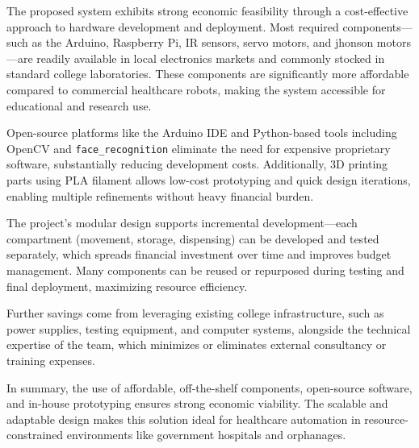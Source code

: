 The proposed system exhibits strong economic feasibility through a cost-effective approach to hardware development and deployment. Most required components—such as the Arduino, Raspberry Pi, IR sensors, servo motors, and  jhonson motors—are readily available in local electronics markets and commonly stocked in standard college laboratories. These components are significantly more affordable compared to commercial healthcare robots, making the system accessible for educational and research use.

Open-source platforms like the Arduino IDE and Python-based tools including OpenCV and \texttt{face\_recognition} eliminate the need for expensive proprietary software, substantially reducing development costs. Additionally, 3D printing parts using PLA filament allows low-cost prototyping and quick design iterations, enabling multiple refinements without heavy financial burden.

The project’s modular design supports incremental development—each compartment (movement, storage, dispensing) can be developed and tested separately, which spreads financial investment over time and improves budget management. Many components can be reused or repurposed during testing and final deployment, maximizing resource efficiency.

Further savings come from leveraging existing college infrastructure, such as power supplies, testing equipment, and computer systems, alongside the technical expertise of the team, which minimizes or eliminates external consultancy or training expenses.

In summary, the use of affordable, off-the-shelf components, open-source software, and in-house prototyping ensures strong economic viability. The scalable and adaptable design makes this solution ideal for healthcare automation in resource-constrained environments like government hospitals and orphanages.
